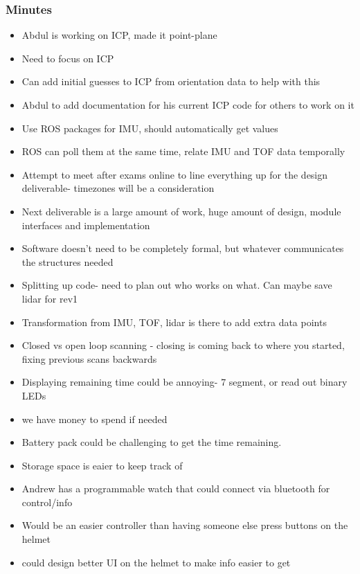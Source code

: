 		\subsubsection*{Minutes}
			\begin{itemize}
				\item Abdul is working on ICP, made it point-plane
				\item Need to focus on ICP 
				\item Can add initial guesses to ICP from orientation data to help with this
				\item Abdul to add documentation for his current ICP code for others to work on it
				\item Use ROS packages for IMU, should automatically get values
				\item ROS can poll them at the same time, relate IMU and TOF data temporally
				\item Attempt to meet after exams online to line everything up for the design deliverable- timezones will be a consideration
				\item Next deliverable is a large amount of work, huge amount of design, module interfaces and implementation
				\item Software doesn't need to be completely formal, but whatever communicates the structures needed
				\item Splitting up code- need to plan out who works on what. Can maybe save lidar for rev1
				\item Transformation from IMU, TOF, lidar is there to add extra data points
				\item Closed vs open loop scanning - closing is coming back to where you started, fixing previous scans backwards
				\item Displaying remaining time could be annoying- 7 segment, or read out binary LEDs
				\item we have money to spend if needed
				\item Battery pack could be challenging to get the time remaining. 
				\item Storage space is eaier to keep track of
				\item Andrew has a programmable watch that could connect via bluetooth for control/info
				\item Would be an easier controller than having someone else press buttons on the helmet
				\item could design better UI on the helmet to make info easier to get
			\end{itemize}

